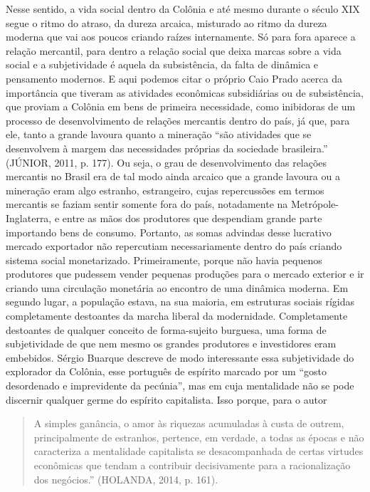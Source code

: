Nesse sentido, a vida social dentro da Colônia e até mesmo durante o
século XIX segue o ritmo do atraso, da dureza arcaica, misturado ao
ritmo da dureza moderna que vai aos poucos criando raízes internamente.
Só para fora aparece a relação mercantil, para dentro a relação social
que deixa marcas sobre a vida social e a subjetividade é aquela da
subsistência, da falta de dinâmica e pensamento modernos. E aqui podemos
citar o próprio Caio Prado acerca da importância que tiveram as
atividades econômicas subsidiárias ou de subsistência, que proviam a
Colônia em bens de primeira necessidade, como inibidoras de um processo
de desenvolvimento de relações mercantis dentro do país, já que, para
ele, tanto a grande lavoura quanto a mineração ``são atividades que se
desenvolvem à margem das necessidades próprias da sociedade
brasileira.'' (JÚNIOR, 2011, p. 177). Ou seja, o grau de desenvolvimento
das relações mercantis no Brasil era de tal modo ainda arcaico que a
grande lavoura ou a mineração eram algo estranho, estrangeiro, cujas
repercussões em termos mercantis se faziam sentir somente fora do país,
notadamente na Metrópole-Inglaterra, e entre as mãos dos produtores que
despendiam grande parte importando bens de consumo. Portanto, as somas
advindas desse lucrativo mercado exportador não repercutiam
necessariamente dentro do país criando sistema social monetarizado.
Primeiramente, porque não havia pequenos produtores que pudessem vender
pequenas produções para o mercado exterior e ir criando uma circulação
monetária ao encontro de uma dinâmica moderna. Em segundo lugar, a
população estava, na sua maioria, em estruturas sociais rígidas
completamente destoantes da marcha liberal da modernidade. Completamente
destoantes de qualquer conceito de forma-sujeito burguesa, uma forma de
subjetividade de que nem mesmo os grandes produtores e investidores eram
embebidos. Sérgio Buarque descreve de modo interessante essa
subjetividade do explorador da Colônia, esse português de espírito
marcado por um ``gosto desordenado e imprevidente da pecúnia'', mas em
cuja mentalidade não se pode discernir qualquer germe do espírito
capitalista. Isso porque, para o autor

\begin{quote}
A simples ganância, o amor às riquezas acumuladas à custa de outrem,
principalmente de estranhos, pertence, em verdade, a todas as épocas e
não caracteriza a mentalidade capitalista se desacompanhada de certas
virtudes econômicas que tendam a contribuir decisivamente para a
racionalização dos negócios.'' (HOLANDA, 2014, p. 161).
\end{quote}

